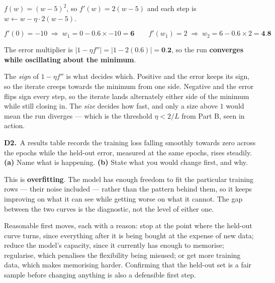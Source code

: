 \documentclass[10pt,a4paper]{article}
\newcommand{\sol}[1]{\textbf{#1}}
\begin{document}
\vspace{2pt}

$f(w) = (w-5)^2$, so $f'(w) = 2(w-5)$ and each step is $w \leftarrow w - \eta \cdot 2(w-5)$.

\[ f'(0) = -10 \;\Rightarrow\; w_1 = 0 - 0.6 \times -10 = \sol{6} \qquad f'(w_1) = 2 \;\Rightarrow\; w_2 = 6 - 0.6 \times 2 = \sol{4.8} \]

The error multiplier is $\lvert 1 - \eta f'' \rvert = \lvert 1 - 2(0.6) \rvert = \sol{0.2}$, so the run \sol{converges while oscillating about the minimum}.

\vspace{2pt}

The \emph{sign} of $1 - \eta f''$ is what decides which. Positive and the error keeps its sign, so the iterate creeps towards the minimum from one side. Negative and the error flips sign every step, so the iterate lands alternately either side of the minimum while still closing in. The \emph{size} decides how fast, and only a size above $1$ would mean the run diverges --- which is the threshold $\eta < 2/L$ from Part B, seen in action.

\vspace{6pt}

\textbf{D2.}\ A results table records the training loss falling smoothly towards zero across the epochs while the held-out error, measured at the same epochs, rises steadily. \textbf{(a)} Name what is happening. \textbf{(b)} State what you would change first, and why.

\vspace{2pt}

This is \textbf{overfitting}. The model has enough freedom to fit the particular training rows --- their noise included --- rather than the pattern behind them, so it keeps improving on what it can see while getting worse on what it cannot. The gap between the two curves is the diagnostic, not the level of either one.\par\vspace{1mm}Reasonable first moves, each with a reason: stop at the point where the held-out curve turns, since everything after it is being bought at the expense of new data; reduce the model's capacity, since it currently has enough to memorise; regularise, which penalises the flexibility being misused; or get more training data, which makes memorising harder. Confirming that the held-out set is a fair sample before changing anything is also a defensible first step.

\newpage
\end{document}
